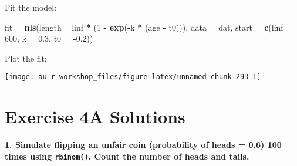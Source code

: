 \documentclass[]{book}
\newenvironment{Shaded}{\begin{snugshade}}{\end{snugshade}}
\newcommand{\KeywordTok}[1]{\textcolor[rgb]{0.13,0.29,0.53}{\textbf{#1}}}
\newcommand{\DataTypeTok}[1]{\textcolor[rgb]{0.13,0.29,0.53}{#1}}
\newcommand{\DecValTok}[1]{\textcolor[rgb]{0.00,0.00,0.81}{#1}}
\newcommand{\FloatTok}[1]{\textcolor[rgb]{0.00,0.00,0.81}{#1}}
\newcommand{\StringTok}[1]{\textcolor[rgb]{0.31,0.60,0.02}{#1}}
\newcommand{\OperatorTok}[1]{\textcolor[rgb]{0.81,0.36,0.00}{\textbf{#1}}}
\newcommand{\NormalTok}[1]{#1}
\theoremstyle{definition}
\theoremstyle{definition}
\theoremstyle{definition}
\theoremstyle{remark}
\begin{document}
Fit the model:

\begin{Shaded}
\begin{Highlighting}[]
\NormalTok{fit =}\StringTok{ }\KeywordTok{nls}\NormalTok{(length }\OperatorTok{~}\StringTok{ }\NormalTok{linf }\OperatorTok{*}\StringTok{ }\NormalTok{(}\DecValTok{1} \OperatorTok{-}\StringTok{ }\KeywordTok{exp}\NormalTok{(}\OperatorTok{-}\NormalTok{k }\OperatorTok{*}\StringTok{ }\NormalTok{(age }\OperatorTok{-}\StringTok{ }\NormalTok{t0))),}
          \DataTypeTok{data =}\NormalTok{ dat, }\DataTypeTok{start =} \KeywordTok{c}\NormalTok{(}\DataTypeTok{linf =} \DecValTok{600}\NormalTok{, }\DataTypeTok{k =} \FloatTok{0.3}\NormalTok{, }\DataTypeTok{t0 =} \OperatorTok{-}\FloatTok{0.2}\NormalTok{))}
\end{Highlighting}
\end{Shaded}

Plot the fit:

\begin{Shaded}
\end{Shaded}

\begin{center}\texttt{[image: au-r-workshop\_files/figure-latex/unnamed-chunk-293-1]} \end{center}

\hypertarget{ex4a-answers}{\section*{Exercise 4A
Solutions}\label{ex4a-answers}}

\textbf{1. Simulate flipping an unfair coin (probability of heads = 0.6)
100 times using \texttt{rbinom()}. Count the number of heads and tails.}
\end{document}
